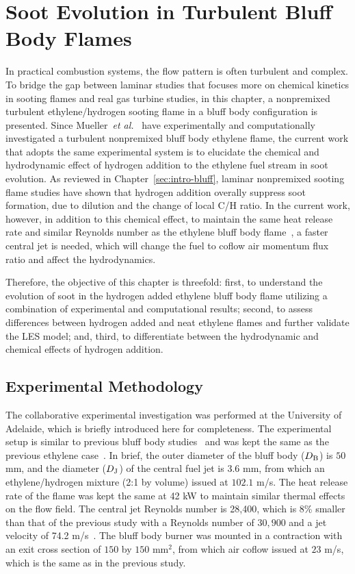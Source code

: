 \chapter{Soot Evolution in Turbulent Bluff Body Flames}\label{ch:bluff}

In practical combustion systems, the flow pattern is often turbulent and complex.  To bridge the gap between laminar studies that focuses more on chemical kinetics in sooting flames and real gas turbine studies, in this chapter, a nonpremixed turbulent ethylene/hydrogen sooting flame in a bluff body configuration is presented.  Since Mueller~\emph{et al.}~\cite{mueller13} have experimentally and computationally investigated a turbulent nonpremixed bluff body ethylene flame, the current work that adopts the same experimental system is to elucidate the chemical and hydrodynamic effect of hydrogen addition to the ethylene fuel stream in soot evolution.  As reviewed in Chapter~\ref{sec:intro-bluff}, laminar nonpremixed sooting flame studies have shown that hydrogen addition overally suppress soot formation, due to dilution and the change of local C/H ratio.  In the current work, however, in addition to this chemical effect, to maintain the same heat release rate and similar Reynolds number as the ethylene bluff body flame~\cite{mueller13}, a faster central jet is needed, which will change the fuel to coflow air momentum flux ratio and affect the hydrodynamics. 

Therefore, the objective of this chapter is threefold: first, to understand the evolution of soot in the hydrogen added ethylene bluff body flame utilizing a combination of experimental and computational results; second, to assess differences between hydrogen added and neat ethylene flames and further validate the LES model; and, third, to differentiate between the hydrodynamic and chemical effects of hydrogen addition.

\section{Experimental Methodology}

The collaborative experimental investigation was performed at the University of Adelaide, which is briefly introduced here for completeness.  The experimental setup is similar to previous bluff body studies~\cite{dally96,dally98a} and was kept the same as the previous ethylene case~\cite{mueller13}.  In brief, the outer diameter of the bluff body ($D_{\rm B}$) is $50$ mm, and the diameter ($D_{\rm J}$) of the central fuel jet is $3.6$ mm, from which an ethylene/hydrogen mixture (2:1 by volume) issued at $102.1$ m/s.  The heat release rate of the flame was kept the same at 42 kW to maintain similar thermal effects on the flow field.  The central jet Reynolds number is 28,400, which is 8\% smaller than that of the previous study with a Reynolds number of $30,900$ and a jet velocity of 74.2 m/s~\cite{mueller13}.  The bluff body burner was mounted in a contraction with an exit cross section of $150$ by $150$ mm$^2$, from which air coflow issued at $23$ m/s, which is the same as in the previous study.

